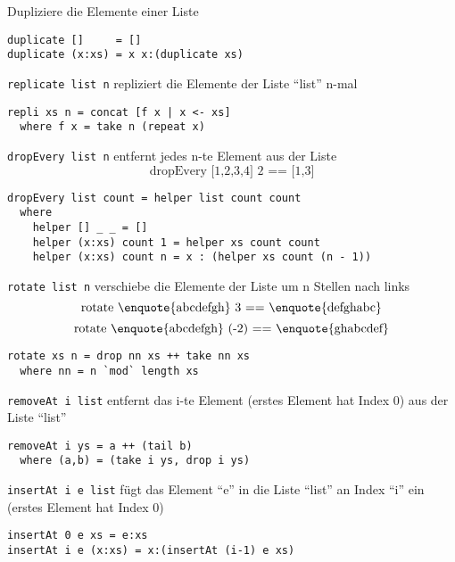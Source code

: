 Dupliziere die Elemente einer Liste
\begin{lstlisting}
duplicate []     = []
duplicate (x:xs) = x x:(duplicate xs)
\end{lstlisting}

\texttt{replicate list n} repliziert die Elemente der Liste \enquote{list} n-mal
\begin{lstlisting}
repli xs n = concat [f x | x <- xs]
  where f x = take n (repeat x)
\end{lstlisting}

\texttt{dropEvery list n} entfernt jedes n-te Element aus der Liste
$$\text{dropEvery [1,2,3,4] 2 == [1,3]}$$
\begin{lstlisting}
dropEvery list count = helper list count count
  where 
    helper [] _ _ = []
    helper (x:xs) count 1 = helper xs count count
    helper (x:xs) count n = x : (helper xs count (n - 1))
\end{lstlisting}

\texttt{rotate list n} verschiebe die Elemente der Liste um n Stellen nach links
$$\text{rotate \enquote{abcdefgh} 3 == \enquote{defghabc}}$$
$$\text{rotate \enquote{abcdefgh} (-2) == \enquote{ghabcdef}}$$
\begin{lstlisting}
rotate xs n = drop nn xs ++ take nn xs
  where nn = n `mod` length xs
\end{lstlisting}

\texttt{removeAt i list} entfernt das i-te Element (erstes Element hat Index 0) aus der Liste \enquote{list} 
\begin{lstlisting}
removeAt i ys = a ++ (tail b)
  where (a,b) = (take i ys, drop i ys)
\end{lstlisting}

\texttt{insertAt i e list} fügt das Element \enquote{e} in die Liste \enquote{list} an Index \enquote{i} ein (erstes Element hat Index 0)
\begin{lstlisting}
insertAt 0 e xs = e:xs
insertAt i e (x:xs) = x:(insertAt (i-1) e xs)
\end{lstlisting}